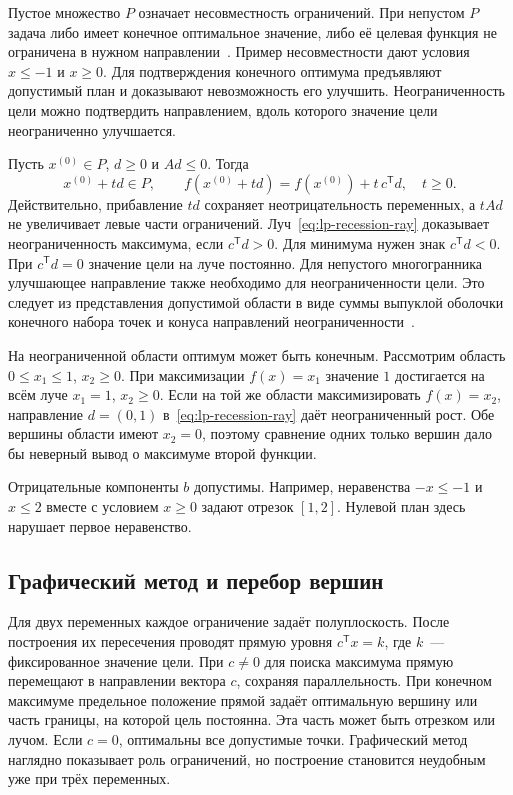 Пустое множество $P$ означает несовместность ограничений. При непустом
$P$ задача либо имеет конечное оптимальное значение, либо её целевая
функция не ограничена в нужном направлении~\cite{vanderbei2020}.
Пример несовместности дают условия $x\le -1$ и $x\ge 0$.
Для подтверждения конечного оптимума предъявляют допустимый план и
доказывают невозможность его улучшить. Неограниченность цели можно
подтвердить направлением, вдоль которого значение цели неограниченно
улучшается.

Пусть $x^{(0)}\in P$, $d\ge 0$ и $Ad\le 0$. Тогда
\begin{equation}
  x^{(0)}+td\in P,\qquad
  f(x^{(0)}+td)=f(x^{(0)})+t\,c^{\mathsf T}d,\quad t\ge 0 .
  \label{eq:lp-recession-ray}
\end{equation}
Действительно, прибавление $td$ сохраняет неотрицательность переменных,
а $tAd$ не увеличивает левые части ограничений. Луч~\eqref{eq:lp-recession-ray}
доказывает неограниченность максимума, если $c^{\mathsf T}d>0$.
Для минимума нужен знак $c^{\mathsf T}d<0$. При $c^{\mathsf T}d=0$
значение цели на луче постоянно. Для непустого многогранника
улучшающее направление также необходимо для неограниченности цели.
Это следует из представления допустимой области в виде суммы
выпуклой оболочки конечного набора точек и конуса направлений
неограниченности~\cite{vanderbei2020}.

На неограниченной области оптимум может быть конечным. Рассмотрим область
$0\le x_1\le 1$, $x_2\ge 0$. При максимизации $f(x)=x_1$ значение $1$
достигается на всём луче $x_1=1$, $x_2\ge 0$.
Если на той же области максимизировать $f(x)=x_2$, направление
$d=(0,1)$ в~\eqref{eq:lp-recession-ray} даёт неограниченный рост.
Обе вершины области имеют $x_2=0$, поэтому сравнение одних только
вершин дало бы неверный вывод о максимуме второй функции.

Отрицательные компоненты $b$ допустимы. Например, неравенства
$-x\le -1$ и $x\le 2$ вместе с условием $x\ge 0$ задают отрезок
$[1,2]$. Нулевой план здесь нарушает первое неравенство.

\subsection{Графический метод и перебор вершин}

Для двух переменных каждое ограничение задаёт полуплоскость. После
построения их пересечения проводят прямую уровня $c^{\mathsf T}x=k$,
где $k$~--- фиксированное значение цели. При $c\ne 0$ для поиска максимума
прямую перемещают в направлении вектора $c$, сохраняя параллельность.
При конечном максимуме предельное положение прямой задаёт оптимальную
вершину или часть границы, на которой цель постоянна. Эта часть может
быть отрезком или лучом. Если $c=0$, оптимальны все допустимые точки.
Графический метод наглядно показывает роль ограничений, но построение
становится неудобным уже при трёх переменных.


